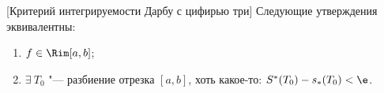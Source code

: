 [Критерий интегрируемости Дарбу с цифирью три]
 	Следующие утверждения эквивалентны:
 	\begin{enumerate}
 	  \item $f\in\Rim[a,b]$;
 	  \item $\exists\  T_0$ "--- разбиение отрезка $[a,b]$, хоть какое-то: $S^*(T_0)-s_*(T_0)<\e$.
 	\end{enumerate}
 